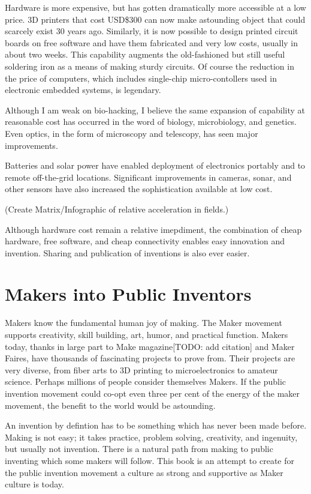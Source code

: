 \documentclass[
	fontsize=10pt, %
	twoside=false, %
	secnumdepth=1, %
]{kaobook}
\begin{document}
Hardware is more expensive, but has gotten dramatically
more accessible at a low price. 3D printers that cost USD\$300
can now make astounding object that could scarcely exist 30
years ago. Similarly, it is now possible to design printed
circuit boards on free software and have them fabricated
and very low costs, usually in about two weeks.
This capability augments the old-fashioned but still
useful soldering iron as a means of making sturdy circuits.
Of course the reduction in the price of computers, which
includes single-chip micro-contollers used in electronic
embedded systems, is legendary.

Although I am weak on bio-hacking, I believe the same
expansion of capability at reasonable cost has occurred in
the word of biology, microbiology, and genetics.
Even optics, in the form of microscopy and telescopy,
has seen major improvements.

Batteries and solar power have enabled deployment of
electronics portably and to remote off-the-grid locations.
Significant improvements in cameras, sonar, and other
sensors have also increased the sophistication available
at low cost.

(Create Matrix/Infographic of relative acceleration in fields.)

Although hardware cost remain a relative imepdiment,
the combination of cheap hardware, free software, and
cheap connectivity enables easy innovation and invention.
Sharing and publication of inventions is also
ever easier.

\section{Makers into Public Inventors}

Makers know the fundamental human joy of making.
The Maker movement supports creativity, skill building,
art, humor, and practical function.
Makers today, thanks in large part to Make magazine[TODO: add citation]
and Maker Faires, have thousands of fascinating
projects to prove from.
Their projects are very diverse, from fiber arts to
3D printing to microelectronics to amateur science.
Perhaps millions of people consider themselves Makers.
If the public invention movement could co-opt even three per cent
of the energy of the maker movement, the benefit to the world would
be astounding.

An invention by defintion has to be something
which has never been made before.
Making is not easy; it takes practice, problem solving, creativity,
and ingenuity, but usually not invention.
There is a natural path from making to
public inventing which some makers will follow.
This book is an attempt to create
for the public invention movement
a culture as strong and supportive as
Maker culture is today.
\end{document}
